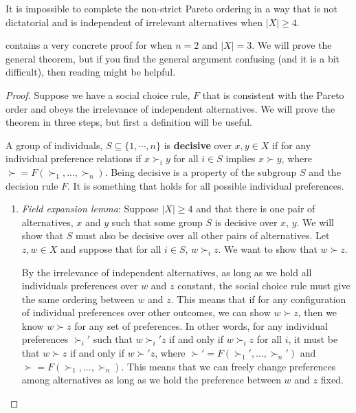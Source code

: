 \begin{theorem}
  It is impossible to complete the non-strict Pareto ordering in a way that
  is not dictatorial and is independent of irrelevant alternatives
  when $|X| \geq 4$. 
\end{theorem}
\cite{feldman1974} contains a very concrete proof for when $n=2$ and
$|X|=3$. We will prove the general theorem, but if you find the
general argument confusing (and it is a bit difficult), then reading
\cite{feldman1974} might be helpful.
\begin{proof}
  Suppose we have a social choice rule, $F$ that is consistent with
  the Pareto order and obeys the irrelevance of independent
  alternatives. We will prove the theorem in three steps, but first a
  definition will be useful.

  A group of individuals, $S \subseteq \{1,\cdots,n\}$ is
  \textbf{decisive} over $x, y \in X$ if for any individual preference
  relations if $x \succ_i y$ for all $i \in S$ implies $x \succ y$,
  where $\succ=F(\succ_1,..., \succ_n)$. Being decisive is a property
  of the subgroup $S$ and the decision rule $F$. It is something that
  holds for all possible individual preferences.
  
  \begin{enumerate}
  \item \emph{Field expansion lemma}: Suppose $|X|\geq 4$ and that there is one pair of
    alternatives, $x$ and $y$ such that some group $S$ is decisive
    over $x$, $y$.  We will show that $S$ must also be decisive over
    all other pairs of alternatives.  Let $z, w\in X$ and suppose that
    for all $i \in S$, $w \succ_i z$. We want to show that $w \succ z$.

    By the irrelevance of independent alternatives, as long as we hold
    all individuals preferences over $w$ and $z$ constant, the social
    choice rule must give the same ordering between $w$ and $z$. This
    means that if for any configuration of individual preferences over
    other outcomes, we can show $w \succ z$, then we know $w \succ z$
    for any set of preferences.
    In other words, for any individual preferences  
    $\succ_i'$ such that $w \succ_i' z$ if and only if $w \succ_i z$ for all $i$,
    it must be that $w \succ z$ if and only if $w \succ' z$, where
    $\succ'=F(\succ_1',...,\succ_n')$ and
    $\succ=F(\succ_1,...,\succ_n)$.  This means that we can freely
    change preferences among alternatives as long as we hold the
    preference between $w$ and $z$ fixed.


\end{enumerate}
\end{proof}
